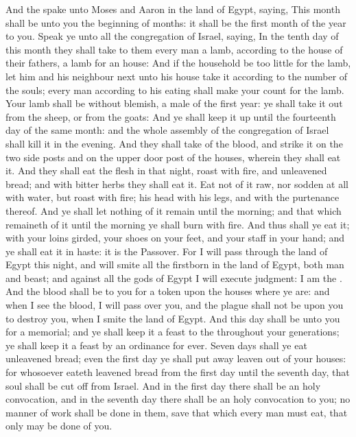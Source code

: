 \begin{biblechapter} %
 And the \LORD spake unto Moses and Aaron in the land of Egypt, saying,
\verse This month shall be unto you the beginning of months: it shall be the first month of the year to you.
\verse Speak ye unto all the congregation of Israel, saying, In the tenth day of this month they shall take to them every man a lamb, according to the house of their fathers, a lamb for an house:
\verse And if the household be too little for the lamb, let him and his neighbour next unto his house take it according to the number of the souls; every man according to his eating shall make your count for the lamb.
\verse Your lamb shall be without blemish, a male of the first year: ye shall take it out from the sheep, or from the goats:
\verse And ye shall keep it up until the fourteenth day of the same month: and the whole assembly of the congregation of Israel shall kill it in the evening.
\verse And they shall take of the blood, and strike it on the two side posts and on the upper door post of the houses, wherein they shall eat it.
\verse And they shall eat the flesh in that night, roast with fire, and unleavened bread; and with bitter herbs they shall eat it.
\verse Eat not of it raw, nor sodden at all with water, but roast with fire; his head with his legs, and with the purtenance thereof.
\verse And ye shall let nothing of it remain until the morning; and that which remaineth of it until the morning ye shall burn with fire.
\verse And thus shall ye eat it; with your loins girded, your shoes on your feet, and your staff in your hand; and ye shall eat it in haste: it is the \LORDs Passover.
\verse For I will pass through the land of Egypt this night, and will smite all the firstborn in the land of Egypt, both man and beast; and against all the gods of Egypt I will execute judgment: I am the \LORD.
\verse And the blood shall be to you for a token upon the houses where ye are: and when I see the blood, I will pass over you, and the plague shall not be upon you to destroy you, when I smite the land of Egypt.
\verse And this day shall be unto you for a memorial; and ye shall keep it a feast to the \LORD throughout your generations; ye shall keep it a feast by an ordinance for ever.
\verse Seven days shall ye eat unleavened bread; even the first day ye shall put away leaven out of your houses: for whosoever eateth leavened bread from the first day until the seventh day, that soul shall be cut off from Israel.
\verse And in the first day there shall be an holy convocation, and in the seventh day there shall be an holy convocation to you; no manner of work shall be done in them, save that which every man must eat, that only may be done of you.

\end{biblechapter}
